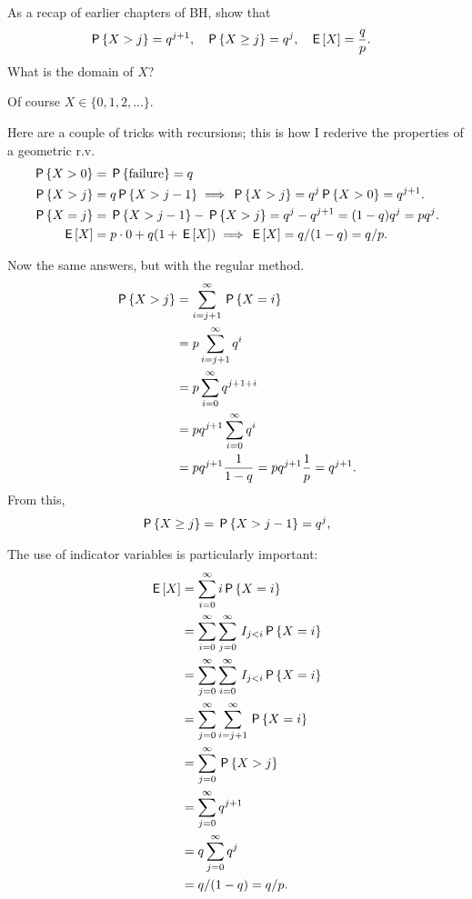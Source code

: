 \documentclass[a4paper,11pt]{article}
\begin{document}
\begin{exercise}
As a recap of earlier chapters of BH, show that
\begin{align}
  \label{eq:9}
\P{X>j} &= q^{j+1}, &\P{X\geq j} &=q^j,& \E{X}&=\frac q{p}.
 \end{align}
What is the domain of $X$?
\begin{solution}
Of course $X \in \{0, 1, 2, \ldots\}$.

Here are a couple of tricks with recursions; this is how I rederive the properties of a geometric r.v.
\begin{align}
  \label{eq:8}
\P{X>0} &= \P{\textrm{failure}} = q\\
\P{X>j} &= q \P{X>j-1} \implies \P{X>j}=q^{j}\P{X>0} = q^{j+1}.\\
\P{X=j} &= \P{X>j-1} - \P{X>j} = q^{j}-q^{j+1} = (1-q)q^{j} = p q^{j}.\\
\E X &= p\cdot 0 + q(1+\E X) \implies \E X = q/(1-q) = q/p.
\end{align}

Now the same answers, but with the regular method. 
  \begin{align}
    \label{eq:5}
\P{X>j}    
&= \sum_{i=j+1}^{\infty} \P{X=i} \\
&= p\sum_{i=j+1}^{\infty} q^{i} \\
&= p\sum_{i=0}^{\infty} q^{j+1+i} \\
&= pq^{j+1}\sum_{i=0}^{\infty} q^{i} \\
&= pq^{j+1}\frac 1 {1-q} = p q^{j+1} \frac 1 p = q^{j+1}.
  \end{align}
From this,
  \begin{align}
    \label{eq:56}
  \P{X\geq j}  &= \P{X>j-1} = q^{j}, \\
  \end{align}

The use of indicator variables is particularly important:
  \begin{align}
    \label{eq:58}
\E X 
&= \sum_{i=0}^{\infty} i\P{X=i} \\
&=  \sum_{i=0}^{\infty} \sum_{j=0}^{\infty} \1{j<i} \P{X=i} \\
&=  \sum_{j=0}^{\infty} \sum_{i=0}^{\infty} \1{j<i} \P{X=i} \\
&=  \sum_{j=0}^{\infty} \sum_{i=j+1}^{\infty}  \P{X=i} \\
&=  \sum_{j=0}^{\infty}  \P{X>j} \\
&=  \sum_{j=0}^{\infty}  q^{j+1}\\
&=  q \sum_{j=0}^{\infty}  q^{j}\\
&=  q/(1-q) = q/p.
  \end{align}

\end{solution}
\end{exercise}
\end{document}
